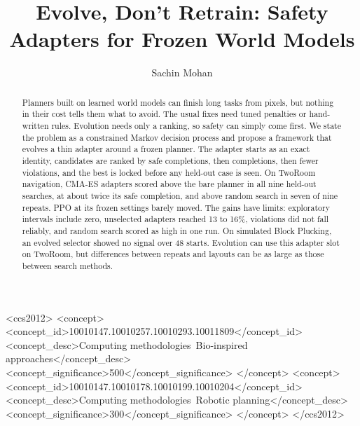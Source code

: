 \documentclass[dvipsnames,format=sigconf]{acmart}
\begin{document}
\title{Evolve, Don't Retrain: Safety Adapters for Frozen World Models}

\author{Sachin Mohan}

\begin{abstract}
Planners built on learned world models can finish long tasks from pixels, but nothing in
their cost tells them what to avoid. The usual fixes need tuned penalties or hand-written
rules. Evolution needs only a ranking, so safety can simply come first. We state the
problem as a constrained Markov decision process and propose a framework that evolves a
thin adapter around a frozen planner. The adapter starts as an exact identity, candidates
are ranked by safe completions, then completions, then fewer violations, and the best is
locked before any held-out case is seen. On TwoRoom navigation, CMA-ES adapters scored above
the bare planner in all nine held-out searches, at about twice its safe completion, and
above random search in seven of nine repeats. PPO at its frozen settings barely moved. The
gains have limits: exploratory intervals include zero, unselected adapters reached 13 to
16\%, violations did not fall reliably, and random search scored as high in one run. On
simulated Block Plucking, an evolved selector showed no signal over 48 starts. Evolution can
use this adapter slot on TwoRoom, but differences between repeats and layouts can be as large
as those between search methods.
\end{abstract}

\begin{CCSXML}
<ccs2012>
<concept>
<concept_id>10010147.10010257.10010293.10011809</concept_id>
<concept_desc>Computing methodologies~Bio-inspired approaches</concept_desc>
<concept_significance>500</concept_significance>
</concept>
<concept>
<concept_id>10010147.10010178.10010199.10010204</concept_id>
<concept_desc>Computing methodologies~Robotic planning</concept_desc>
<concept_significance>300</concept_significance>
</concept>
</ccs2012>
\end{CCSXML}


\maketitle
\end{document}
